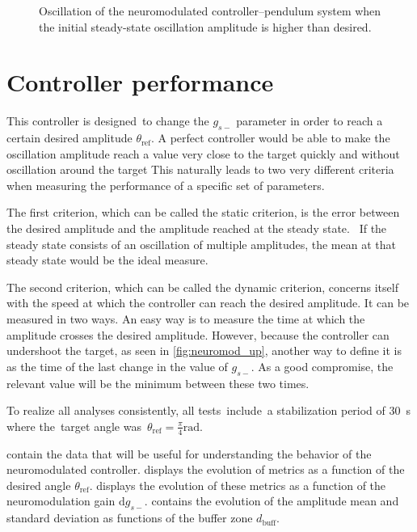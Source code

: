 \begin{figure}[!htbp]
    \centering
    \caption{Oscillation of the neuromodulated controller–pendulum system when the initial steady-state oscillation amplitude is higher than desired.}
    \label{fig:neuromod_down}
\end{figure}

\section{Controller performance}

This controller is designed to change the $g_{s-}$ parameter in order to reach a certain desired amplitude $\theta_\text{ref}$.
A perfect controller would be able to make the oscillation amplitude reach a value very close to the target quickly and without oscillation around the target
This naturally leads to two very different criteria when measuring the performance of a specific set of parameters.

The first criterion, which can be called the static criterion, is the error between the desired amplitude and the amplitude reached at the steady state. 
If the steady state consists of an oscillation of multiple amplitudes, the mean at that steady state would be the ideal measure.

The second criterion, which can be called the dynamic criterion, concerns itself with the speed at which the controller can reach the desired amplitude.
It can be measured in two ways.
An easy way is to measure the time at which the amplitude crosses the desired amplitude.
However, because the controller can undershoot the target, as seen in \cref{fig:neuromod_up}, another way to define it is as the time of the last change in the value of $g_{s-}$.
As a good compromise, the relevant value will be the minimum between these two times.

To realize all analyses consistently, all tests include a stabilization period of \qty{30}{\second} where the target angle was $\theta_\text{ref} = \frac{\pi}{4}\unit{\radian}$.

 contain the data that will be useful for understanding the behavior of the neuromodulated controller.
 displays the evolution of metrics as a function of the desired angle $\theta_\text{ref}$.
 displays the evolution of these metrics as a function of the neuromodulation gain $\mathrm{d}g_{s-}$.
 contains the evolution of the amplitude mean and standard deviation as functions of the buffer zone $d_\text{buff}$.

